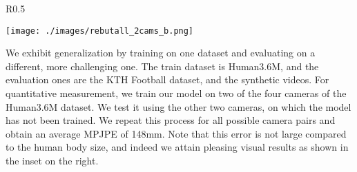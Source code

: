 \begin{wrapfigure}{R}{0.5\textwidth}
\centering

\setlength{\abovecaptionskip}{-32pt plus 3pt minus 2pt}
\setlength{\belowcaptionskip}{0pt plus 3pt minus 2pt}
\caption*{}
\texttt{[image: ./images/rebutall\_2cams\_b.png]}

\setlength{\abovecaptionskip}{-33pt plus 3pt minus 2pt}
\setlength{\belowcaptionskip}{0pt plus 3pt minus 2pt}
\caption*{}
\label{fig:generalization_inset}

\end{wrapfigure} 
We exhibit generalization by training on one dataset and evaluating on a different, more challenging one. The train dataset is Human3.6M, and the evaluation ones are the KTH Football dataset, and the synthetic videos.
For quantitative measurement, we train our model on two of the four cameras of the Human3.6M dataset.
We test it using the other two cameras, on which the model has not been trained. 
We repeat this process for all possible camera pairs and obtain an average MPJPE of 148mm. Note that this error is not large compared to the human body size, and indeed we attain pleasing visual results as shown in the inset on the right.

